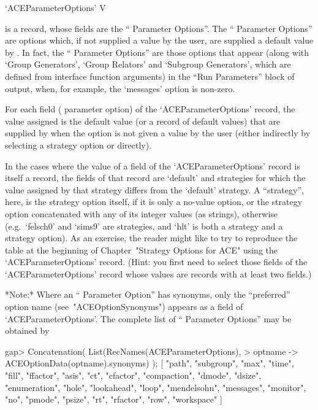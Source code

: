 \>`ACEParameterOptions' V

is a {\GAP} record, whose fields are the ``{\ACE} Parameter Options''.
The ``{\ACE} Parameter Options'' are options which, if not supplied  a
value by the user, are supplied a default value by  {\ACE}.  In  fact,
the ``{\ACE} Parameter Options'' are those options that appear  (along
with `Group Generators', `Group Relators' and  `Subgroup  Generators',
which are defined from {\ACE} interface  function  arguments)  in  the
``Run Parameters'' block of {\ACE}  output,  when,  for  example,  the
`messages' option is non-zero.

For each field ({\ACE} parameter option) of the  `ACEParameterOptions'
record, the value assigned is  the  default  value  (or  a  record  of
default values) that are supplied by {\ACE} when  the  option  is  not
given a value by the user (either indirectly by selecting  a  strategy
option or directly).

In the cases where the value of a field of  the  `ACEParameterOptions'
record is itself a record, the fields of that record are `default' and
strategies for which the value assigned by that strategy differs  from
the `default' strategy. A ``strategy'', here, is the  strategy  option
itself, if it is only  a  no-value  option,  or  the  strategy  option
concatenated with any of its integer values  (as  strings),  otherwise
(e.g.~`felsch0' and `sims9'  are  strategies,  and  `hlt'  is  both  a
strategy and a strategy option). As an exercise, the reader might like
to try to reproduce the table at the  beginning  of  Chapter~"Strategy
Options for ACE" using the `ACEParameterOptions'  record.  (Hint:  you
first need to select those fields of the `ACEParameterOptions'  record
whose values are records with at least two fields.)

*Note:*
Where  an  ``{\ACE}  Parameter  Option''  has   synonyms,   only   the
``preferred'' option name (see~"ACEOptionSynonyms") appears as a field
of `ACEParameterOptions'. The  complete  list  of  ``{\ACE}  Parameter
Options'' may be obtained by

\beginexample
gap> Concatenation( List(RecNames(ACEParameterOptions),
>                        optname -> ACEOptionData(optname).synonyms) );
[ "path", "subgroup", "max", "time", "fill", "ffactor", "asis", "ct", 
  "cfactor", "compaction", "dmode", "dsize", "enumeration", "hole", 
  "lookahead", "loop", "mendelsohn", "messages", "monitor", "no", "pmode", 
  "psize", "rt", "rfactor", "row", "workspace" ]

\endexample

